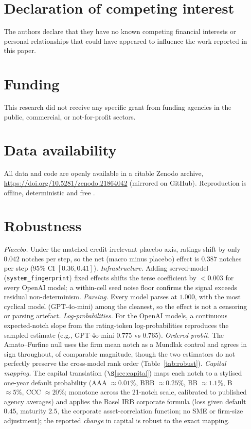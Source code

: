 \documentclass[a4paper,fleqn]{cas-sc}
\begin{document}
\section*{Declaration of competing interest}
The authors declare that they have no known competing financial interests or personal relationships
that could have appeared to influence the work reported in this paper.

\section*{Funding}
This research did not receive any specific grant from funding agencies in the public, commercial, or
not-for-profit sectors.

\section*{Data availability}
All data and code are openly available in a citable Zenodo archive,
\url{https://doi.org/10.5281/zenodo.21864042} (mirrored on GitHub). Reproduction is offline,
deterministic and free \citep{artifact2026}.

\appendix
\section{Robustness}\label{app:robust}

\emph{Placebo.} Under the matched credit-irrelevant placebo axis, ratings shift by only $0.042$ notches
per step, so the net (macro minus placebo) effect is $0.387$ notches per step (95\% CI $[0.36,0.41]$).
\emph{Infrastructure.} Adding served-model (\texttt{system\_fingerprint}) fixed effects shifts the
terse coefficient by $<0.003$ for every OpenAI model; a within-cell seed noise floor confirms the
signal exceeds residual non-determinism. \emph{Parsing.} Every model parses at $1.000$, with the most
cyclical model (GPT-4o-mini) among the cleanest, so the effect is not a censoring or parsing artefact.
\emph{Log-probabilities.} For the OpenAI models, a continuous expected-notch slope from the
rating-token log-probabilities reproduces the sampled estimate (e.g., GPT-4o-mini $0.775$ vs $0.765$).
\emph{Ordered probit.} The Amato--Furfine null uses the firm mean notch as a Mundlak control and agrees
in sign throughout, of comparable magnitude, though the two estimators do not perfectly preserve the
cross-model rank order (Table~\ref{tab:robust}). \emph{Capital mapping.} The capital translation
($\S$\ref{sec:capital}) maps each notch to a stylised one-year default probability (AAA $\approx
0.01\%$, BBB $\approx 0.25\%$, BB $\approx 1.1\%$, B $\approx 5\%$, CCC $\approx 20\%$; monotone across
the 21-notch scale, calibrated to published agency averages) and applies the Basel IRB corporate
formula (loss given default $0.45$, maturity $2.5$, the corporate asset-correlation function; no SME or
firm-size adjustment); the reported \emph{change} in capital is robust to the exact mapping.
\end{document}

